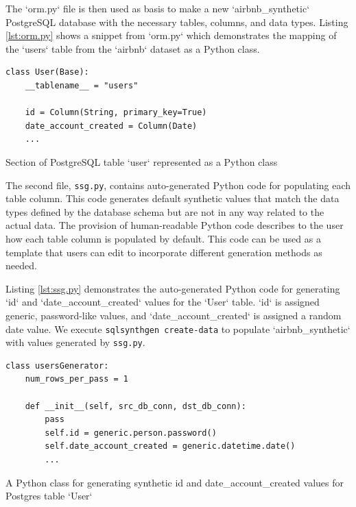 \documentclass[11pt]{article}
\begin{document}
The `orm.py` file is then used as basis to make a new `airbnb\_synthetic` PostgreSQL database with the necessary tables, columns, and data types. Listing \ref{lst:orm.py} shows a snippet from `orm.py` which demonstrates the mapping of the `users` table from the `airbnb`  dataset as a Python class.

\begin{listing}[H]
\begin{verbatim}
class User(Base):
    __tablename__ = "users"

    id = Column(String, primary_key=True)
    date_account_created = Column(Date)
    ...
\end{verbatim}
\caption{Section of PostgreSQL table `user` represented as a Python class}
\label{lst:orm.py}
\end{listing}

The second file, \texttt{ssg.py}, contains auto-generated Python code for populating each table column. This code generates default synthetic values that match the data types defined by the database schema but are not in any way related to the actual data. The provision of human-readable Python code describes to the user how each table column is populated by default. This code can be used as a template that users can edit to incorporate different generation methods as needed.

Listing \ref{lst:ssg.py} demonstrates the auto-generated Python code for generating `id` and `date\_account\_created` values for the `User` table. `id` is assigned generic, password-like values, and `date\_account\_created` is assigned a random date value. We execute \texttt{sqlsynthgen create-data} to populate `airbnb\_synthetic` with values generated by \texttt{ssg.py}.

\begin{listing}[H]
\begin{verbatim}
class usersGenerator:
    num_rows_per_pass = 1

    def __init__(self, src_db_conn, dst_db_conn):
        pass
        self.id = generic.person.password()
        self.date_account_created = generic.datetime.date()
        ...
\end{verbatim}
\caption{A Python class for generating synthetic id and date\_account\_created values for Postgres table `User`}
\label{lst:ssg.py}
\end{listing}
\end{document}

